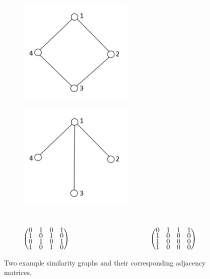 \begin{figure}[H]
  \centering
   \begin{subfigure}{0.4\textwidth}
    \centering
    \includegraphics[width = 0.6\textwidth]{adj_square.png}
   \end{subfigure}
  \begin{subfigure}{0.4\textwidth}
    \centering
    \includegraphics[width = 0.6\textwidth]{adj_tree.png}
  \end{subfigure}\\
\begin{equation*}
\renewcommand*{\arraystretch}{.5}
  \begin{pmatrix}
    0 & 1 & 0 & 1 \\
    1 & 0 & 1 & 0 \\
    0 & 1 & 0 & 1 \\
    1 & 0 & 1 & 0 
    \end{pmatrix}
\hspace{1.6in}
\renewcommand*{\arraystretch}{.5}
  \begin{pmatrix}
    0 & 1 & 1 & 1 \\
    1 & 0 & 0 & 0 \\
    1 & 0 & 0 & 0 \\
    1 & 0 & 0 & 0 
    \end{pmatrix}
\end{equation*}
\caption{Two example similarity graphs and their corresponding adjacency matrices.}
\label{fig:sim_graphs}
\end{figure}

